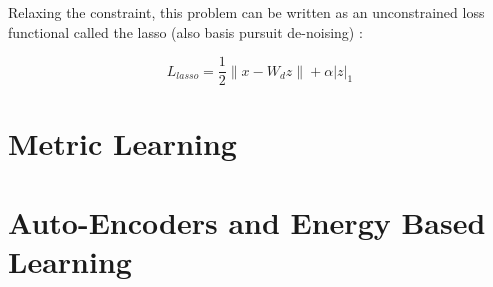 Relaxing the constraint, this problem can be written as an unconstrained loss
functional called the lasso (also basis pursuit de-noising) \cite{BP}:  

\begin{equation} 
L_{lasso} = \frac{1}{2}\|x-W_dz\| + \alpha |z|_1
\end{equation} 


\section{Metric Learning}

\section{Auto-Encoders and Energy Based Learning} 
 
